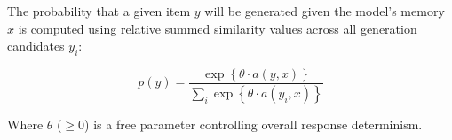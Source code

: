 \documentclass[12pt]{article}
\begin{document}
The probability that a given item $y$ will be generated given the model's memory $x$ is computed using relative summed similarity values across all generation candidates $y_i$:

\begin{equation}
p(y) = \dfrac
{ \exp  \left \{ \theta \cdot a \left( y, x \right) \right \} } 
{ \sum_i{ \exp  \left \{ \theta \cdot a \left( y_i, x \right) \right\}  } }
\label{eq:packer-choice}
\end{equation}

Where $\theta$ ($\geq 0$) is a free parameter controlling overall response determinism.
\end{document}
